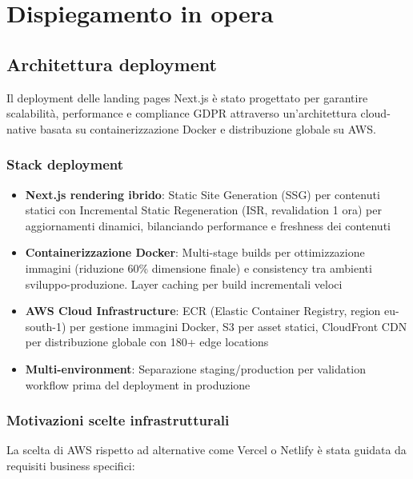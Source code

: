\chapter{Dispiegamento in opera}

\section{Architettura deployment}

Il deployment delle landing pages Next.js è stato progettato per garantire scalabilità, performance e compliance GDPR attraverso un'architettura cloud-native basata su containerizzazione Docker e distribuzione globale su AWS.

\subsection{Stack deployment}

\begin{itemize}
  \item \textbf{Next.js rendering ibrido}: Static Site Generation (SSG) per contenuti statici con Incremental Static Regeneration (ISR, revalidation 1 ora) per aggiornamenti dinamici, bilanciando performance e freshness dei contenuti
  
  \item \textbf{Containerizzazione Docker}: Multi-stage builds per ottimizzazione immagini (riduzione 60\% dimensione finale) e consistency tra ambienti sviluppo-produzione. Layer caching per build incrementali veloci
  
  \item \textbf{AWS Cloud Infrastructure}: ECR (Elastic Container Registry, region eu-south-1) per gestione immagini Docker, S3 per asset statici, CloudFront CDN per distribuzione globale con 180+ edge locations
  
  \item \textbf{Multi-environment}: Separazione staging/production per validation workflow prima del deployment in produzione
\end{itemize}

\subsection{Motivazioni scelte infrastrutturali}

La scelta di AWS rispetto ad alternative come Vercel o Netlify è stata guidata da requisiti business specifici:

